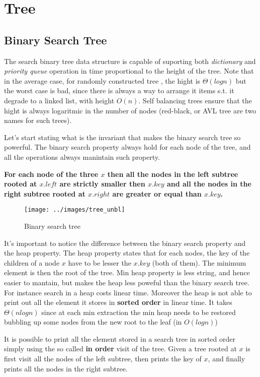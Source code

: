 \chapter{Tree}


\section{Binary Search Tree}
The search binary tree data structure is capable of suporting both \textit{dictionary} and \textit{priority queue} operation in time proportional to the height of the tree.
Note that in the average case, for randomly constructed tree , the hight is $\Theta(log n)$ but the worst case is bad, since there is always a way to arrange it items s.t. it degrade to a linked list, with height $O(n)$. Self balancing trees ensure that the hight is always logaritmic in the number of nodes (red-black, or AVL tree are two names for such trees).

Let's start stating what is the invariant that makes the binary search tree so powerful. The binary search property always hold for each node of the tree, and all the operations always manintain such property.


\textbf{For each node of the three $x$ then all the nodes in the left subtree rooted at $x.left$ are strictly smaller  then $x.key$ and all the nodes in the right subtree rooted at $x.right$ are greater or equal than $x.key$.
}

	\begin{figure}
	\label{fig:tree_visits}
	\centering
		\texttt{[image: ../images/tree\_unbl]}
		\caption{Binary search tree}
	\end{figure}

It's important to notice the difference between the binary search property and the heap property. The heap property states that for each nodes, the key of the children  of a node $x$ have to be lesser the $x.key$ (both of them). The minimum element is then the root of the tree. Min heap property is less string, and hence easier to mantain, but makes the heap less poweful than the binary search tree. For instance search in a heap costs linear time. Moreover the heap is not able to print out all the element it stores in \textbf{sorted order} in linear time. It takes $\Theta(nlogn)$ since at each min extraction the min heap needs to be restored bubbling up some nodes from the new root to the leaf (in $O(log n)$) 

It is possible to print all the element stored in a search tree in sorted order simply using the so called \textbf{in order} visit of the tree. Given a tree rooted at $x$ is first visit all the nodes of the left subtree, then prints the key of $x$, and finally prints all the nodes in the right subtree.



